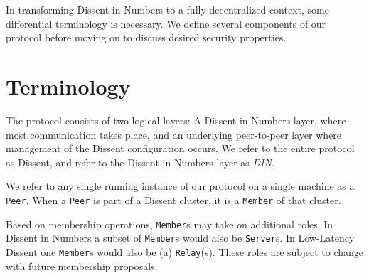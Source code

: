 In transforming Dissent in Numbers\cite{wolinsky_dissent_2012} to a fully
decentralized context, some differential terminology is necessary. We define
several components of our protocol before moving on to discuss desired security
properties.

\section{Terminology}
The protocol consists of two logical layers: A Dissent in Numbers layer, where
most communication takes place, and an underlying peer-to-peer layer where
management of the Dissent configuration occurs. We refer to the entire protocol
as Dissent, and refer to the Dissent in Numbers layer as \textit{DIN}.

We refer to any single running instance of our protocol on a single machine as a
\texttt{Peer}. When a \texttt{Peer} is part of a Dissent cluster, it is a
\texttt{Member} of that cluster.

Based on membership operations, \texttt{Member}s may take on additional roles.
In Dissent in Numbers a subset of \texttt{Member}s would also be
\texttt{Server}s. In Low-Latency Dissent one \texttt{Member}s would
also be (a) \texttt{Relay}(s). These roles are subject to change with future
membership proposals.

